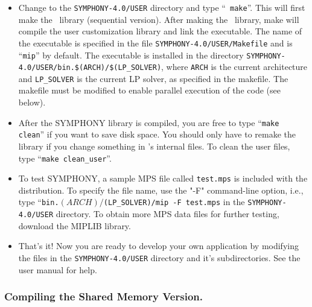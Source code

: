 \begin{itemize}
        \item Change to the \texttt{SYMPHONY-4.0/USER} directory and type
``\texttt{ make}''. This will first make the
\BB\ library (sequential version). After making the \BB\ library, make will
compile the user customization library and link the executable. The name of
the executable is specified in the file \texttt{SYMPHONY-4.0/USER/Makefile}
and is ``\texttt{mip}'' by default. The executable is installed in the directory
\texttt{SYMPHONY-4.0/USER/bin.\$(ARCH)/\$(LP\_SOLVER)}, where \texttt{ARCH} is 
the current architecture and \texttt{LP\_SOLVER} is the current LP solver, as 
specified in the makefile. The makefile must be modified to enable parallel 
execution of the code (see below).

\item After the SYMPHONY library is compiled, you are free to type ``{\tt make
        clean}'' if you want to save disk space. You should only have to
        remake the library if you change something in \BB's internal files. To
        clean the user files, type ``{\tt make
        clean\_user}''.

\item To test SYMPHONY, a sample MPS file called \texttt{test.mps} is included 
with the distribution. To specify the file name, use the "-F" command-line
option, i.e., type ``\texttt{bin.$(ARCH)/$(LP\_SOLVER)/mip -F test.mps} in the
\texttt{SYMPHONY-4.0/USER} directory. To obtain more MPS data files for further
testing, download the MIPLIB library.

\item That's it! Now you are ready to develop your own application by modifying
the files in the \texttt{SYMPHONY-4.0/USER} directory and it's
subdirectories. See the user manual for help.

\end{itemize}

\subsubsection{Compiling the Shared Memory Version.}

